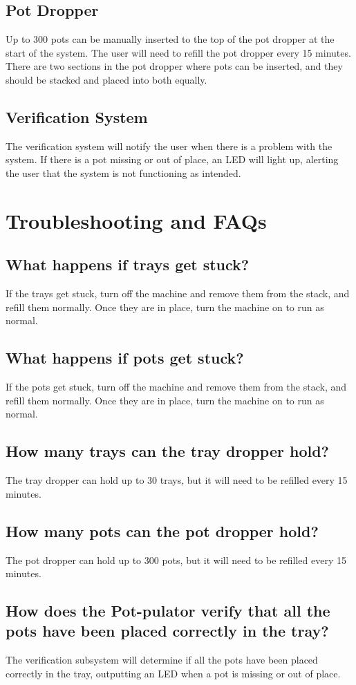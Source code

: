 \documentclass{article}
\begin{document}
\subsection{Pot Dropper}
Up to 300 pots can be manually inserted to the top of the pot dropper at the start of the system. The user will need to refill the pot dropper every 15 minutes. There are two sections in the pot dropper where pots can be inserted, and they should be stacked and placed into both equally.
\subsection{Verification System}
The verification system will notify the user when there is a problem with the system. If there is a pot missing or out of place, an LED will light up, alerting the user that the system is not functioning as intended. 
\section{Troubleshooting and FAQs}
\subsection{What happens if trays get stuck?}
If the trays get stuck, turn off the machine and remove them from the stack, and refill them normally. Once they are in place, turn the machine on to run as normal.
\subsection{What happens if pots get stuck?}
If the pots get stuck, turn off the machine and remove them from the stack, and refill them normally. Once they are in place, turn the machine on to run as normal.
\subsection{How many trays can the tray dropper hold?}
The tray dropper can hold up to 30 trays, but it will need to be refilled every 15 minutes.
\subsection{How many pots can the pot dropper hold?}
The pot dropper can hold up to 300 pots, but it will need to be refilled every 15 minutes.
\subsection{How does the Pot-pulator verify that all the pots have been placed correctly in the tray?}
The verification subsystem will determine if all the pots have been placed correctly in the tray, outputting an LED when a pot is missing or out of place.
\end{document}
